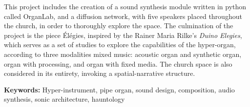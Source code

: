 \documentclass[12pt,twoside,maitrise]{dms_ks}
\newlength{\oldparskip}
\let\oldtableofcontents\tableofcontents  %
\renewcommand{\tableofcontents}{  %
    \begingroup
    \setlength{\parskip}{0pt}  %
    \oldtableofcontents  %
    \endgroup
    \setlength{\parskip}{\oldparskip}  %
}
\theoremstyle{definition}
\begin{document}
This project includes the creation of a sound synthesis module written in python called OrganLab, and a diffusion network, with five speakers placed throughout the church, in order to thoroughly explore the space. 
The culmination of the project is the piece Élégies, inspired by the Rainer Maria Rilke's \textit{Duino Elegies}, which serves as a set of studies to explore the capabilities of the hyper-organ, according to three modalities mixed music: acoustic organ and synthetic organ, organ with processing, and organ with fixed media. 
The church space is also considered in its entirety, invoking a spatial-narrative structure. 

\textbf{Keywords:} Hyper-instrument, pipe organ, sound design, composition, audio synthesis, sonic architecture, hauntology



\anglais
\cleardoublepage
{}  %
\anglais
\tableofcontents
\cleardoublepage
\anglais
\english
{}  %
\cleardoublepage
{}
\end{document}
